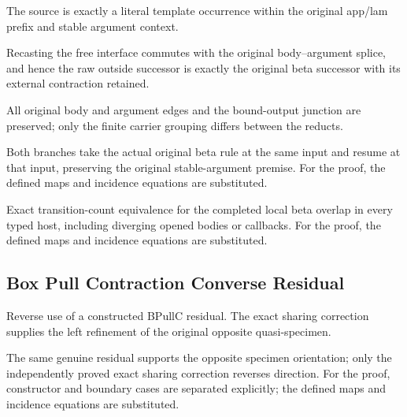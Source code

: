 The source is exactly a literal template occurrence within the original app/lam prefix and stable argument context.
\par{}

Recasting the free interface commutes with the original body--argument splice, and hence the raw outside successor is exactly the original beta successor with its external contraction retained.
\par{}

All original body and argument edges and the bound-output junction are preserved; only the finite carrier grouping differs between the reducts.
\par{}

Both branches take the actual original beta rule at the same input and resume at that input, preserving the original stable-argument premise.
For the proof, the defined maps and incidence equations are substituted.
\par{}

Exact transition-count equivalence for the completed local beta overlap in every typed host, including diverging opened bodies or callbacks.
For the proof, the defined maps and incidence equations are substituted.
\par{}

\subsection{Box Pull Contraction Converse Residual}
Reverse use of a constructed BPullC residual. The exact sharing correction supplies the left refinement of the original opposite quasi-specimen.

The same genuine residual supports the opposite specimen orientation; only the independently proved exact sharing correction reverses direction.
For the proof, constructor and boundary cases are separated explicitly; the defined maps and incidence equations are substituted.
\par{}

